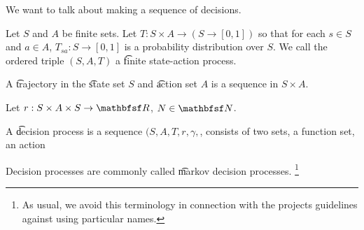 
We want to talk about making a sequence of decisions.


Let $S$ and $A$ be finite sets.
Let $T: S \times  A \to (S \to [0, 1])$ so that for each $s \in S$ and $a \in A$, $T_{sa}: S \to [0, 1]$ is a probability distribution over $S$.
We call the ordered triple $(S, A, T)$ a \t{finite state-action process}.

A \t{trajectory} in the \t{state set} $S$ and \t{action set} $A$ is a sequence in $S \times  A$.

Let $r: S \times  A \times  S \to \R $, $N \in \N $.

A \t{decision process} is a sequence $(S, A, T, r, \gamma , $, consists of two sets, a function set, an action

Decision processes are commonly called \t{markov decision processes}.
  \ifhmode\unskip\fi\footnote{
As usual, we avoid this terminology in connection with the projects guidelines against using particular names.
  }

\blankpage
